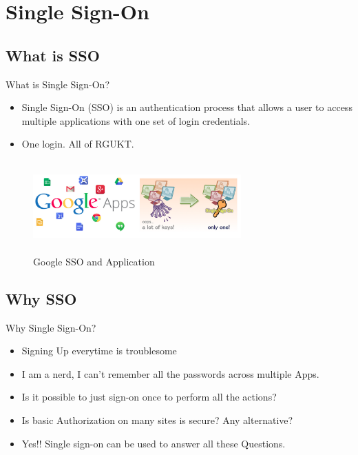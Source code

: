 \documentclass[xcolor=dvipsnames]{beamer}
\begin{document}
\section{Single Sign-On}
\subsection{What is SSO}
\begin{frame}{What is Single Sign-On?}
 
\begin{itemize}
	\item Single Sign-On (SSO) is an authentication process that allows a user to access multiple applications with one set of login credentials. 
	\item One login. All of RGUKT.
\end{itemize}

\begin{figure}
\includegraphics[width=8cm,height=3.5cm]{SSO}
\caption{Google SSO and Application \label{fig:Google SSO and Application}}
\end{figure}

\end{frame}
\subsection{Why SSO}
\begin{frame}{Why Single Sign-On?}

\begin{itemize}
	\item Signing Up everytime is troublesome
	\item I am a nerd, I can't remember all the passwords across multiple Apps.
	\item Is it possible to just sign-on once to perform all the actions?
	\item Is basic Authorization on many sites is secure? Any alternative?
	\item Yes!! Single sign-on can be used to answer all these Questions.
\end{itemize}

\end{frame}
\end{document}
